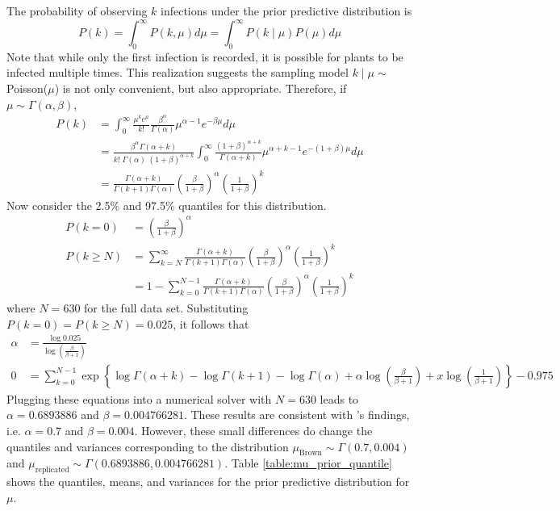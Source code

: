 \documentclass{uwstat572}
\begin{document}
The probability of observing $k$ infections under the prior predictive distribution is
\begin{equation}
P(k) = \int_0^{\infty} P(k, \mu) d\mu = \int_0^{\infty} P(k \mid \mu)  P(\mu) d\mu
\label{eq:prior_predictive}
\end{equation}
Note that while only the first infection is recorded, it is possible for plants to be infected multiple times. 
This realization suggests the sampling model $k \mid \mu \sim$ Poisson($\mu$) is not only convenient, but also appropriate. 
Therefore, if $\mu \sim \Gamma(\alpha, \beta)$,
\begin{align*}
P(k) &= \int_0^{\infty} \frac{\mu^k e^{\mu}}{k!}  \frac{\beta^{\alpha}}{\Gamma(\alpha)} \mu^{\alpha - 1} e^{-\beta \mu}d\mu \\
	&= \frac{\beta^{\alpha} \Gamma(\alpha+k)}{k! \; \Gamma(\alpha) \; (1+\beta)^{\alpha+k}}  \int_0^{\infty} \frac{(1+\beta)^{\alpha+k}}{\Gamma(\alpha+k)} \mu^{\alpha + k - 1} e^{-(1+\beta)\mu}d\mu \\
	&= \frac{\Gamma(\alpha+k)}{\Gamma(k+1) \Gamma(\alpha)} \left( \frac{\beta}{1+\beta} \right)^{\alpha} \left( \frac{1}{1+\beta} \right)^k
\end{align*}
Now consider the 2.5\% and 97.5\% quantiles for this distribution. 
\begin{align*}
P(k=0) &= \left( \frac{\beta}{1+\beta} \right)^{\alpha} \\
P(k \ge N) &= \sum_{k=N}^{\infty} \frac{\Gamma(\alpha+k)}{\Gamma(k+1) \Gamma(\alpha)} \left( \frac{\beta}{1+\beta} \right)^{\alpha} \left( \frac{1}{1+\beta} \right)^k \\
	&=1 - \sum_{k=0}^{N-1} \frac{\Gamma(\alpha+k)}{\Gamma(k+1) \Gamma(\alpha)} \left( \frac{\beta}{1+\beta} \right)^{\alpha} \left( \frac{1}{1+\beta} \right)^k 
\end{align*}
where $N=630$ for the full data set. 
Substituting $P(k=0)=P(k \ge N)=0.025$, it follows that 
\begin{align*}
\alpha &= \frac{\log 0.025}{\log \left( \frac{\beta}{\beta+1} \right)} \\
0 &= \sum_{k=0}^{N-1} \exp \left\{ \log \Gamma(\alpha+k) - \log \Gamma(k+1) - \log \Gamma(\alpha) + \alpha \log \left(\frac{\beta}{\beta +1} \right) + x \log \left(\frac{1}{\beta +1} \right) \right\} - 0.975
\end{align*}
Plugging these equations into a numerical solver with $N=630$ leads to $\alpha=0.6893886$ and $\beta=0.004766281$. 
These results are consistent with \citet{Brown}'s findings, i.e. $\alpha=0.7$ and $\beta=0.004$. 
However, these small differences do change the quantiles and variances corresponding to the distribution $\mu_{\text{Brown}} \sim \Gamma(0.7, 0.004)$ and $\mu_{\text{replicated}} \sim \Gamma(0.6893886, 0.004766281)$. 
Table \ref{table:mu_prior_quantile} shows the quantiles, means, and variances for the prior predictive distribution for $\mu$. 
\end{document}
